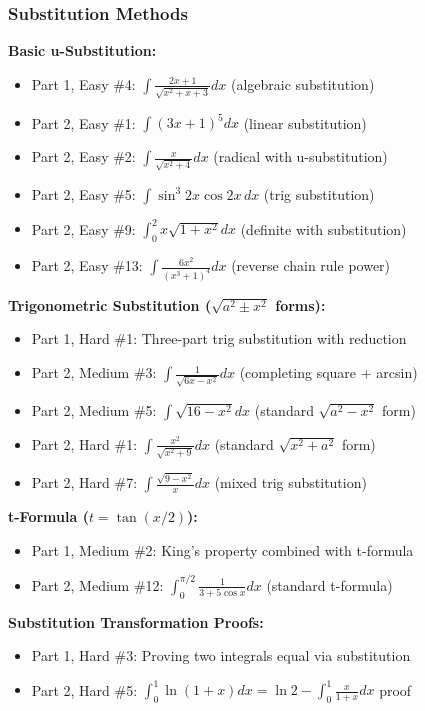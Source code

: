 
\subsubsection*{Substitution Methods}

\textbf{Basic u-Substitution:}
\begin{itemize}
  \item Part 1, Easy \#4: $\int \frac{2x+1}{\sqrt{x^2+x+3}}dx$ (algebraic substitution)
  \item Part 2, Easy \#1: $\int (3x+1)^5 dx$ (linear substitution)
  \item Part 2, Easy \#2: $\int \frac{x}{\sqrt{x^2+4}}dx$ (radical with u-substitution)
  \item Part 2, Easy \#5: $\int \sin^3 2x \cos 2x \, dx$ (trig substitution)
  \item Part 2, Easy \#9: $\int_0^2 x\sqrt{1+x^2}dx$ (definite with substitution)
  \item Part 2, Easy \#13: $\int \frac{6x^2}{(x^3+1)^4}dx$ (reverse chain rule power)
\end{itemize}

\textbf{Trigonometric Substitution ($\sqrt{a^2 \pm x^2}$ forms):}
\begin{itemize}
  \item Part 1, Hard \#1: Three-part trig substitution with reduction
  \item Part 2, Medium \#3: $\int \frac{1}{\sqrt{6x-x^2}}dx$ (completing square + arcsin)
  \item Part 2, Medium \#5: $\int \sqrt{16-x^2}dx$ (standard $\sqrt{a^2-x^2}$ form)
  \item Part 2, Hard \#1: $\int \frac{x^2}{\sqrt{x^2+9}}dx$ (standard $\sqrt{x^2+a^2}$ form)
  \item Part 2, Hard \#7: $\int \frac{\sqrt{9-x^2}}{x}dx$ (mixed trig substitution)
\end{itemize}

\textbf{t-Formula ($t = \tan(x/2)$):}
\begin{itemize}
  \item Part 1, Medium \#2: King's property combined with t-formula
  \item Part 2, Medium \#12: $\int_0^{\pi/2} \frac{1}{3+5\cos x}dx$ (standard t-formula)
\end{itemize}

\textbf{Substitution Transformation Proofs:}
\begin{itemize}
  \item Part 1, Hard \#3: Proving two integrals equal via substitution
  \item Part 2, Hard \#5: $\int_0^1 \ln(1+x)dx = \ln 2 - \int_0^1 \frac{x}{1+x}dx$ proof
\end{itemize}

